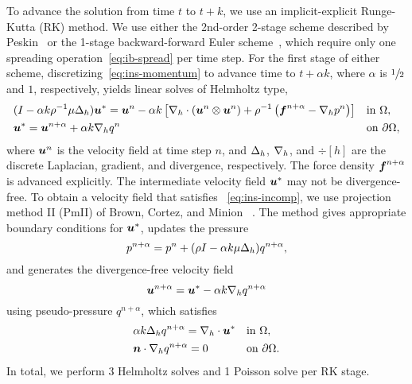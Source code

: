 To advance the solution from time $t$ to $t+k$, we use an implicit-explicit Runge-Kutta
(RK) method. We use either the 2nd-order 2-stage scheme described by Peskin~%
\cite{Peskin:2002go} or the 1-stage backward-forward Euler scheme~\cite{Ascher:1997tm},
which require only one spreading operation~\eqref{eq:ib-spread} per time step.
For the first stage of either scheme, discretizing~\eqref{eq:ins-momentum} to advance
time to $t+\alpha k$, where $\alpha$ is $\sfrac12$ and $1$, respectively, yields linear
solves of Helmholtz type,
\begin{equation}
    \begin{alignedat}{2}
        &(I - \alpha k\rho^{-1}\mu \laplacian_h) \u^\ast = \u^n - \alpha k\left[\div[h]\left(\u^n\otimes\u^n\right) + \rho^{-1}\left(\f^{n+\alpha} - \grad[h]p^n\right)\right] \quad && \text{in}~\domain, \\
        &\u^\ast = \u^{n+\alpha} + \alpha k \grad[h] q^{n} \quad && \text{on}~\partial\domain,
    \end{alignedat}
\end{equation}
where $\boldsymbol{u}^n$ is the velocity field at time step $n$, and $\Delta_h$, $\grad[h]$, and
$\div[h]$ are the discrete Laplacian, gradient, and divergence, respectively. The force
density $\boldsymbol{f}^{n+\alpha}$ is advanced explicitly. The intermediate velocity field $\boldsymbol{u}^\ast$
may not be divergence-free. To obtain a velocity field that satisfies~%
\eqref{eq:ins-incomp}, we use projection method II (PmII) of Brown, Cortez, and Minion~%
\cite{Brown:2001bq}. The method gives appropriate boundary conditions for $\boldsymbol{u}^\ast$, 
updates the pressure
\begin{equation*}
    p^{n+\alpha} = p^n + (\rho I - \alpha k\mu\Delta_h)q^{n+\alpha},
\end{equation*}
and generates the divergence-free velocity field
\begin{equation*}
    \u^{n+\alpha} = \u^\ast - \alpha k\grad[h]q^{n+\alpha}
\end{equation*}
using pseudo-pressure $q^{n+\alpha}$, which satisfies
\begin{equation}
\begin{alignedat}{2}
    &\alpha k \laplacian_h q^{n+\alpha} = \div[h]\u^\ast &&\quad \text{in}~\domain, \\
    &\n\cdot\grad[h] q^{n+\alpha} = 0                    &&\quad \text{on}~\partial\domain.
\end{alignedat}
\end{equation}
In total, we perform 3 Helmholtz solves and 1 Poisson solve per RK stage.

